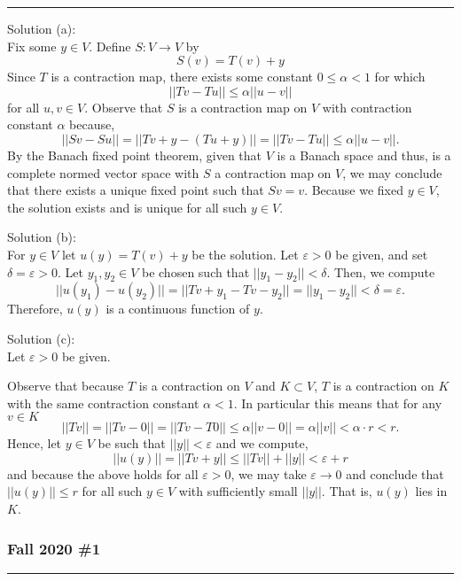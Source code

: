 \documentclass{article}
\begin{document}
\hrule

Solution (a):\\

Fix some $y\in V$. Define $S: V\to V$ by 
	\[S(v) = T(v) + y \]
Since $T$ is a contraction map, there exists some constant $0 \leq \alpha < 1$ for which 
	\[|| Tv - Tu || \leq \alpha || u - v || \]
for all $u,v\in V$. Observe that $S$ is a contraction map on $V$ with contraction constant $\alpha$ because,
	\[|| Sv - Su || = || Tv + y - (Tu + y) || = || Tv - Tu || \leq \alpha || u - v ||.\]
By the Banach fixed point theorem, given that $V$ is a Banach space and thus, is a complete normed vector space with $S$ a contraction map on $V$, we may conclude that there exists a unique fixed point such that $Sv = v$. Because we fixed $y\in V$, the solution exists and is unique for all such $y\in V$.


Solution (b):\\

For $y\in V$ let $u(y) = T(v) + y$ be the solution. Let $\varepsilon > 0$ be given, and set $\delta = \varepsilon > 0$. Let $y_1, y_2\in V$ be chosen such that $|| y_1 - y_2 || < \delta$. Then, we compute
	\[ || u(y_1) - u(y_2) || = || Tv + y_1 - Tv - y_2 || = || y_1 - y_2 || <  \delta = \varepsilon.\]
Therefore, $u(y)$ is a continuous function of $y$.

Solution (c): \\

Let $\varepsilon > 0$ be given.

Observe that because $T$ is a contraction on $V$ and $K\subset V$, $T$ is a contraction on $K$ with the same contraction constant $\alpha < 1 $. In particular this means that for any $v\in K$ 
	\[|| Tv || = || Tv - 0 || = || Tv -T0 || \leq \alpha || v - 0 || = \alpha || v || < \alpha \cdot r < r.\]
Hence, let $y\in V$ be such that $ || y || < \varepsilon $ and we compute,
	\[ || u(y) || = || Tv + y || \leq || Tv || + || y || < \varepsilon + r\]
and because the above holds for all $\varepsilon>0$, we may take $\varepsilon \to 0$ and conclude that $ || u(y) || \leq r $ for all such $y\in V$ with sufficiently small $|| y ||$. That is, $u(y)$ lies in $K$.

	

\break

\subsubsection{Fall 2020 \#1}

\hrule 
\end{document}

